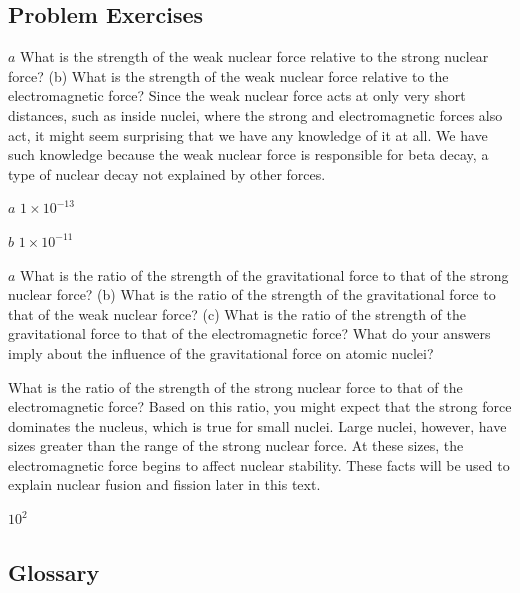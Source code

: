 \documentclass[
]{book}
\newenvironment{problems-exercises}{}{}
\begin{document}
\hypertarget{fs-id3082682}{}
\begin{problems-exercises}

\hypertarget{problem-exercises-5}{%
\subsection{Problem Exercises}\label{problem-exercises-5}}

\hypertarget{fs-id2680982}{}
\leavevmode\hypertarget{fs-id1413270}{}%
\(a\) What is the strength of the weak nuclear force relative to the
strong nuclear force? (b) What is the strength of the weak nuclear force
relative to the electromagnetic force? Since the weak nuclear force acts
at only very short distances, such as inside nuclei, where the strong
and electromagnetic forces also act, it might seem surprising that we
have any knowledge of it at all. We have such knowledge because the weak
nuclear force is responsible for beta decay, a type of nuclear decay not
explained by other forces.

\leavevmode\hypertarget{fs-id2688655}{}%
\(a\) \({1 \times \text{10}^{- \text{13}}}{}\)

\(b\) \({1 \times \text{10}^{- \text{11}}}{}\)

\hypertarget{fs-id2670330}{}
\leavevmode\hypertarget{fs-id1935090}{}%
\(a\) What is the ratio of the strength of the gravitational force to
that of the strong nuclear force? (b) What is the ratio of the strength
of the gravitational force to that of the weak nuclear force? (c) What
is the ratio of the strength of the gravitational force to that of the
electromagnetic force? What do your answers imply about the influence of
the gravitational force on atomic nuclei?

\hypertarget{fs-id3092040}{}
\leavevmode\hypertarget{fs-id3092946}{}%
What is the ratio of the strength of the strong nuclear force to that of
the electromagnetic force? Based on this ratio, you might expect that
the strong force dominates the nucleus, which is true for small nuclei.
Large nuclei, however, have sizes greater than the range of the strong
nuclear force. At these sizes, the electromagnetic force begins to
affect nuclear stability. These facts will be used to explain nuclear
fusion and fission later in this text.

\leavevmode\hypertarget{fs-id2408217}{}%
\(\text{10}^{2}{}\)

\end{problems-exercises}

\hypertarget{glossary-16}{%
\subsection{Glossary}\label{glossary-16}}
\end{document}
